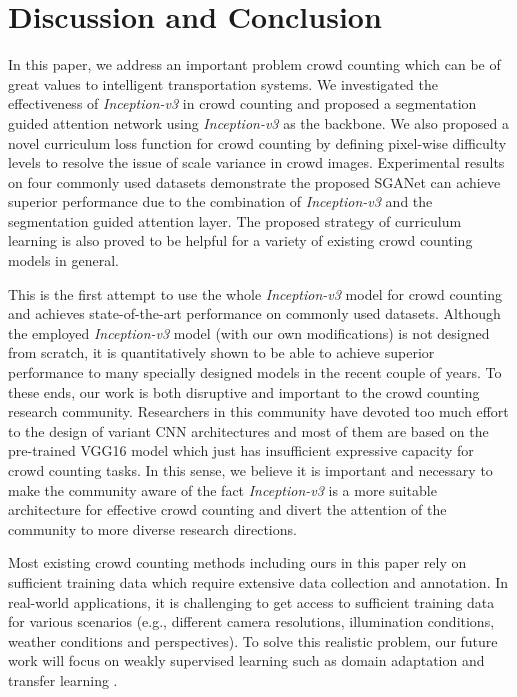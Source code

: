 \documentclass[journal,comsoc]{IEEEtran}
\begin{document}
\section{Discussion and Conclusion} \label{sec:conclusion}
In this paper, we address an important problem crowd counting which can be of great values to intelligent transportation systems. We investigated the effectiveness of \textit{Inception-v3} in crowd counting and proposed a segmentation guided attention network using \textit{Inception-v3} as the backbone. We also proposed a novel curriculum loss function for crowd counting by defining pixel-wise difficulty levels to resolve the issue of scale variance in crowd images. Experimental results on four commonly used datasets demonstrate the proposed SGANet can achieve superior performance due to the combination of \textit{Inception-v3} and the segmentation guided attention layer. The proposed strategy of curriculum learning is also proved to be helpful for a variety of existing crowd counting models in general.

This is the first attempt to use the whole \textit{Inception-v3} model for crowd counting and achieves state-of-the-art performance on commonly used datasets. Although the employed \textit{Inception-v3} model
(with our own modifications) is not designed from scratch,
it is quantitatively shown to be able to achieve superior performance to many specially designed models in the recent
couple of years. To these ends, our work is both disruptive
and important to the crowd counting research community.
Researchers in this community have devoted too much effort to the design of variant CNN architectures and most
of them are based on the pre-trained VGG16 model which
just has insufficient expressive capacity for crowd counting
tasks. In this sense, we believe it is important and necessary to make the community aware of the fact \textit{Inception-v3} is a more suitable architecture for effective crowd counting and divert
the attention of the community to more diverse research directions.

Most existing crowd counting methods including ours in this paper rely on sufficient training data which require extensive data collection and annotation. In real-world applications, it is challenging to get access to sufficient training data for various scenarios (e.g., different camera resolutions, illumination conditions, weather conditions and perspectives). To solve this realistic problem, our future work will focus on weakly supervised learning such as domain adaptation \cite{wang2019unsupervised} and transfer learning \cite{wang2019learning}.


\end{document}
